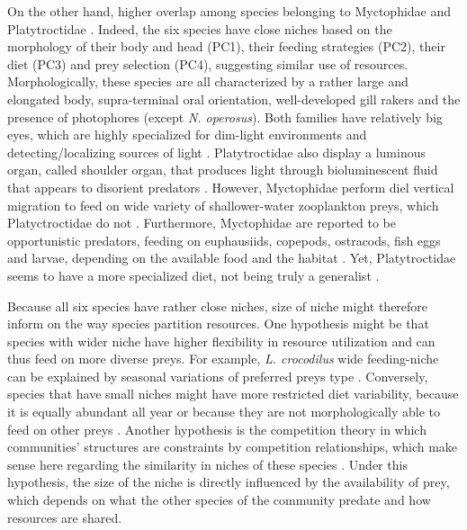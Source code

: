 On the other hand, higher overlap among species belonging to Myctophidae and Platytroctidae . Indeed, the six species have close niches based on the morphology of their body and head (PC1), their feeding strategies (PC2), their diet (PC3) and prey selection (PC4), suggesting similar use of resources. Morphologically, these species are all characterized by a rather large and elongated body, supra-terminal oral orientation, well-developed gill rakers and the presence of photophores (except \textit{N. operosus}). Both families have relatively big eyes, which are highly specialized for dim-light environments and detecting/localizing sources of light \citep{debusserolles2014,novotny2018}. Platytroctidae also display a luminous organ, called shoulder organ, that produces light through bioluminescent fluid that appears to disorient predators \citep{novotny2018}. However, Myctophidae perform diel vertical migration to feed on wide variety of shallower-water zooplankton preys, which Platyctroctidae do not \citep{sutton2013a}. Furthermore, Myctophidae are reported to be opportunistic predators, feeding on euphausiids, copepods, ostracods, fish eggs and larvae, depending on the available food and the habitat \citep{catul2011,kozlov1995}. Yet, Platytroctidae seems to have a more specialized diet, not being truly a generalist \citep{novotny2018}. 

Because all six species have rather close niches, size of niche might therefore inform on the way species partition resources. One hypothesis might be that species with wider niche have higher flexibility in resource utilization and can thus feed on more diverse preys. For example, \textit{L. crocodilus} wide feeding-niche can be explained by seasonal variations of preferred preys type \citet{fanelli2014}. Conversely, species that have small niches might have more restricted diet variability, because it is equally abundant all year or because they are not morphologically able to feed on other preys \citep{mejri2009}. Another hypothesis is the competition theory in which communities' structures are constraints by competition relationships, which make sense here regarding the similarity in niches of these species \citep{geange2011}. Under this hypothesis, the size of the niche is directly influenced by the availability of prey, which depends on what the other species of the community predate and how resources are shared.

